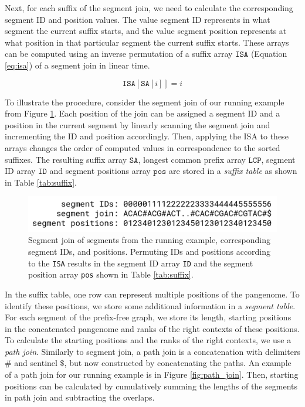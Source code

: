 Next, for each suffix of the segment join, we need to calculate the corresponding segment ID and position values.
The value segment ID represents in what segment the current suffix starts, and the value segment position represents at what position in that particular segment the current suffix starts.
These arrays can be computed using an inverse permutation of a suffix array $\texttt{ISA}$ (Equation \ref{eq:isa}) of a segment join in linear time.

\begin{equation}
    \label{eq:isa}
    \texttt{ISA}[\texttt{SA}[i]] = i
\end{equation}

To illustrate the procedure, consider the segment join of our running example from Figure \ref{fig:ids_and_positions}.
Each position of the join can be assigned a segment ID and a position in the current segment by linearly scanning the segment join and incrementing the ID and position accordingly.
Then, applying the ISA to these arrays changes the order of computed values in correspondence to the sorted suffixes.
The resulting suffix array $\texttt{SA}$, longest common prefix array $\texttt{LCP}$, segment ID array $\texttt{ID}$ and segment positions array $\texttt{pos}$ are stored in a \emph{suffix table} as shown in Table \ref{tab:suffix}.

\begin{figure}
    \centering
    \includegraphics[width=\linewidth]{images/ids_and_positions.png}
    \caption{
    Segment join of segments from the running example, corresponding segment IDs, and positions. Permuting IDs and positions according to the \texttt{ISA} results in the segment ID array \texttt{ID} and the segment position array \texttt{pos} shown in Table \ref{tab:suffix}. \label{fig:ids_and_positions}
    }
\end{figure}





In the suffix table, one row can represent multiple positions of the pangenome.
To identify these positions, we store some additional information in a \emph{segment table}.
For each segment of the prefix-free graph, we store its length, starting positions in the concatenated pangenome and ranks of the right contexts of these positions.
To calculate the starting positions and the ranks of the right contexts, we use a \emph{path join}.
Similarly to segment join, a path join is a concatenation with delimiters $\texttt{\#}$ and sentinel $\texttt{\$}$, but now constructed by concatenating the paths.
An example of a path join for our running example is in Figure \ref{fig:path_join}.
Then, starting positions can be calculated by cumulatively summing the lengths
of the segments in path join and subtracting the overlaps.

